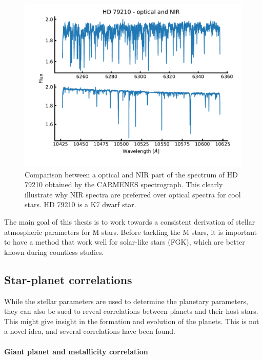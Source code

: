 \begin{figure}[htpb!]
    \centering
    \includegraphics[width=1.0\linewidth]{figures/opticalVSnir.pdf}
    \caption{Comparison between a optical and NIR part of the spectrum of HD 79210 obtained by
             the CARMENES spectrograph. This clearly illustrate why NIR spectra are preferred over
             optical spectra for cool stars. HD 79210 is a K7 dwarf star.}
    \label{fig:opticalVSnir}
\end{figure}

The main goal of this thesis is to work towards a consistent derivation of stellar atmospheric
parameters for M stars. Before tackling the M stars, it is important to have a method that work well
for solar-like stars (FGK), which are better known during countless studies.

\subsection{Star-planet correlations}

While the stellar parameters are used to determine the planetary parameters, they can also be sued
to reveal correlations between planets and their host stars. This might give insight in the
formation and evolution of the planets. This is not a novel idea, and several correlations have been
found.

\paragraph{Giant planet and metallicity correlation}

